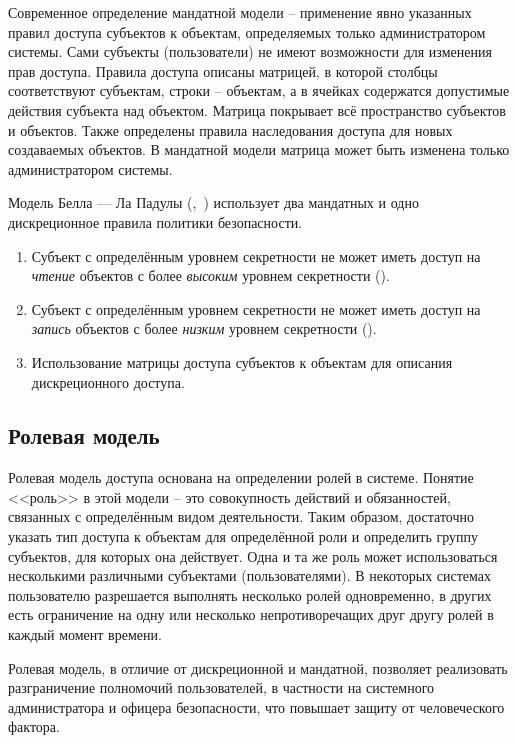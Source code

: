 Современное определение мандатной модели -- применение явно указанных правил доступа субъектов к объектам, определяемых только администратором системы. Сами субъекты (пользователи) не имеют возможности для изменения прав доступа. Правила доступа описаны матрицей, в которой столбцы соответствуют субъектам, строки -- объектам, а в ячейках содержатся допустимые действия субъекта над объектом. Матрица покрывает всё пространство субъектов и объектов. Также определены правила наследования доступа для новых создаваемых объектов. В мандатной модели матрица может быть изменена только администратором системы.

Модель Белла --- Ла Падулы (,~\cite{Bell:LaPadula:1973, Bell:LaPadula:1976}) использует два мандатных и одно дискреционное правила политики безопасности.
\begin{enumerate}
    \item Субъект с определённым уровнем секретности не может иметь доступ на \emph{чтение} объектов с более \emph{высоким} уровнем секретности ().
    \item Субъект с определённым уровнем секретности не может иметь доступ на \emph{запись} объектов с более \emph{низким} уровнем секретности ().
    \item Использование матрицы доступа субъектов к объектам для описания дискреционного доступа.
\end{enumerate}

\subsection{Ролевая модель}

Ролевая модель доступа основана на определении ролей в системе. Понятие <<роль>> в этой модели -- это совокупность действий и обязанностей, связанных с определённым видом деятельности. Таким образом, достаточно указать тип доступа к объектам для определённой роли и определить группу субъектов, для которых она действует.
Одна и та же роль может использоваться несколькими различными субъектами (пользователями). В некоторых системах пользователю разрешается выполнять несколько ролей одновременно, в других есть ограничение на одну или несколько непротиворечащих друг другу ролей в каждый момент времени.

Ролевая модель, в отличие от дискреционной и мандатной, позволяет реализовать разграничение полномочий пользователей, в частности на системного администратора и офицера безопасности, что повышает защиту от человеческого фактора.
